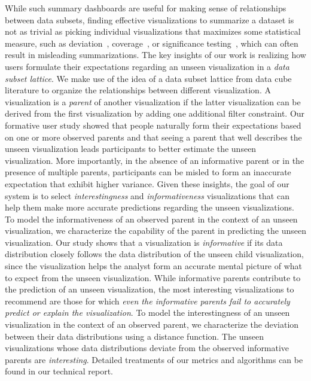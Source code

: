 \par While such summary dashboards are useful for making sense of relationships between data subsets, finding effective visualizations to summarize a dataset is not as trivial as picking individual visualizations that maximizes some statistical measure, such as deviation~\cite{Vartak2015}, coverage~\cite{Sarvghad2017}, or significance testing~\cite{Anand2015}, which can often result in misleading summarizations. The key insights of our work is realizing how users formulate their expectations regarding an unseen visualization in a \textit{data subset lattice}. We make use of the idea of a data subset lattice from data cube literature to organize the relationships between different visualization. A visualization is a \textit{parent} of another visualization if the latter visualization can be derived from the first visualization by adding one additional filter constraint. Our formative user study showed that people naturally form their expectations based on one or more observed parents and that seeing a parent that well describes the unseen visualization leads participants to better estimate the unseen visualization. More importantly, in the absence of an informative parent or in the presence of multiple parents, participants can be misled to form an inaccurate expectation that exhibit higher variance. Given these insights, the goal of our system is to select \textit{interestingness} and \textit{informativeness} visualizations that can help them make more accurate predictions regarding the unseen visualizations. To model the informativeness of an observed parent in the context of an unseen visualization, we characterize the capability of the parent in predicting the unseen visualization. Our study shows that a visualization is \emph{informative} if its data distribution closely follows the data distribution of the unseen child visualization, since the visualization helps the analyst form an accurate mental picture of what to expect from the unseen visualization. While informative parents contribute to the prediction of an unseen visualization, the most interesting visualizations to recommend are those for which \emph{even the informative parents fail to accurately predict or explain the visualization}. To model the interestingness of an unseen visualization in the context of an observed parent, we characterize the deviation between their data distributions using a distance function. The unseen visualizations whose data distributions deviate from the observed informative parents are \emph{interesting}. Detailed treatments of our metrics and algorithms can be found in our technical report. 
